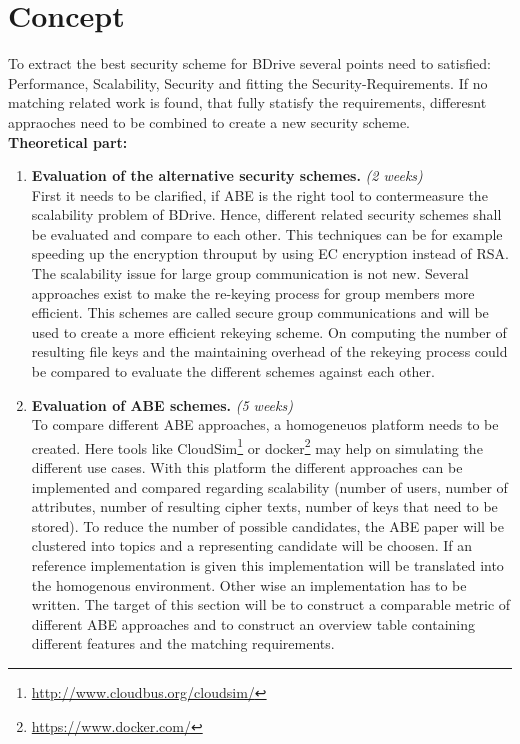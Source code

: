 \documentclass[twocolumn]{article}
\begin{document}
 
\section{Concept}
To extract the best security scheme for BDrive several points need to satisfied: Performance, Scalability, Security and fitting the Security-Requirements. If no matching related work is found, that fully statisfy the requirements, differesnt appraoches need to be combined to create a new security scheme.\\

\noindent \textbf{Theoretical part:}
\begin{enumerate}
	\item\textbf{Evaluation of the alternative security schemes.} \textit{(2 weeks)} \\
		  First it needs to be clarified, if ABE is the right tool to contermeasure the scalability problem of BDrive. Hence, different related security schemes shall be evaluated and compare to each other. This techniques can be for example speeding up the encryption throuput by using EC encryption instead of RSA. The scalability issue for large group communication is not new. Several approaches exist to make the re-keying process for group members more efficient. This schemes are called secure group communications and will be used to create a more efficient rekeying scheme.\cite{wong2000secure}
		  On computing the number of resulting file keys and the maintaining overhead of the rekeying process could be compared to evaluate the different schemes against each other. 

	\item\textbf{Evaluation of ABE schemes.} \textit{(5 weeks)} \\
		  To compare different ABE approaches, a homogeneuos platform needs to be created. Here tools like CloudSim\footnote{\url{http://www.cloudbus.org/cloudsim/}} or docker\footnote{\url{https://www.docker.com/}} may help on simulating the different use cases. With this platform the different approaches can be implemented and compared regarding scalability (number of users, number of attributes, number of resulting cipher texts, number of keys that need to be stored). To reduce the number of possible candidates, the ABE paper will be clustered into topics and a representing candidate will be choosen. If an reference implementation is given this implementation will be translated into the homogenous environment. Other wise an implementation has to be written. 
		  The target of this section will be to construct a comparable metric of different ABE approaches and to construct an overview table containing different features and the matching requirements. 


\end{enumerate}
\end{document}
